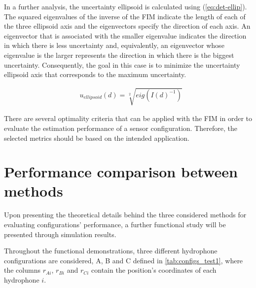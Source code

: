 In a further analysis, the uncertainty ellipsoid is calculated using (\ref{eq:det-ellip}). The squared eigenvalues of the inverse of the FIM indicate the length of each of the three ellipsoid axis and the eigenvectors specify the direction of each axis. An eigenvector that is associated with the smaller eigenvalue indicates the direction in which there is less uncertainty and, equivalently, an eigenvector whose eigenvalue is the larger represents the direction in which there is the biggest uncertainty. Consequently, the goal in this case is to minimize the uncertainty ellipsoid axis that corresponds to the maximum uncertainty.

\begin{eqnarray}
	& u_{ellipsoid}(d) = \sqrt[2]{eig(I(d)^{-1})}
	\label{eq:det-ellip}
\end{eqnarray}

There are several optimality criteria that can be applied with the FIM in order to evaluate the estimation performance of a sensor configuration. Therefore, the selected metrics should be based on the intended application.

\section{Performance comparison between methods} \label{subsec:perform-compar-meth}

Upon presenting the theoretical details behind the three considered methods for evaluating configurations' performance, a further functional study will be presented through simulation results. 

Throughout the functional demonstrations, three different hydrophone configurations are considered, A, B and C defined in \ref{tab:configs_test1}, where the columns $r_{Ai}$, $r_{Bi}$ and $r_{Ci}$ contain the position's coordinates of each hydrophone $i$.

